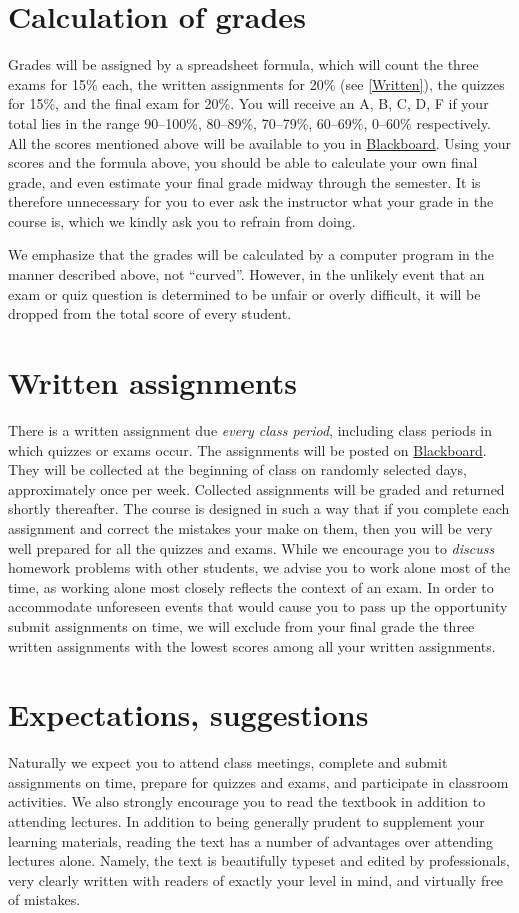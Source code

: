 \documentclass[11pt]{article}
\begin{document}
\section{Calculation of grades}\label{Assessment}
Grades will be assigned by a spreadsheet formula, which will count
the three exams for 15\% each,
the written assignments for 20\% (see \autoref{Written}),
the quizzes for 15\%, and the final exam for 20\%.
You will receive an A, B, C, D, F if your total lies in the range
90--100\%, 80--89\%, 70--79\%, 60--69\%, 0--60\% respectively.
All the scores mentioned above will be available to you in
\href{https://bb.its.iastate.edu}{Blackboard}. Using your scores
and the formula above, you should be able to calculate your own final grade,
and even estimate your final grade midway through the semester.
It is therefore unnecessary for you to ever ask the instructor
what your grade in the course is, which we kindly ask you to refrain from
doing.

We emphasize that the grades will be calculated by a computer program in the manner described
above, not ``curved''. However, in the unlikely event that an exam or quiz question is determined
to be unfair or overly difficult, it will be dropped from the total score of
every student.

\section{Written assignments}\label{Written}
There is a written assignment due {\em every 
class period}, including class periods
in which quizzes or exams occur.
The assignments will be posted on \href{https://bb.its.iastate.edu}{Blackboard}.
They will be collected at the beginning
of class on randomly selected days, approximately
once per week. Collected assignments
will be graded and returned shortly thereafter.
The course is designed in such a way that if you complete each assignment and 
correct the mistakes your make on them,
then you will be very well prepared for all the quizzes and exams.
While we encourage you to {\em discuss} homework problems with other
students, we advise you to work alone most of the time,
as working alone most closely reflects the context of an exam.
In order to accommodate unforeseen events that would cause you
to pass up the opportunity submit assignments on time,
we will exclude from your final grade
the three written assignments with the lowest scores among
all your written assignments.

\section{Expectations, suggestions} Naturally we expect you to attend 
class meetings, complete and submit assignments on 
time, prepare for quizzes and exams, and participate in classroom 
activities. We also strongly encourage you to read the textbook
in addition to attending lectures.
In addition to being generally prudent to 
supplement your learning materials, reading the text has a number of 
advantages over attending lectures alone. Namely, the text is beautifully 
typeset and edited by professionals, very clearly written with readers 
of exactly your level in mind, and virtually free of mistakes.
\end{document}
